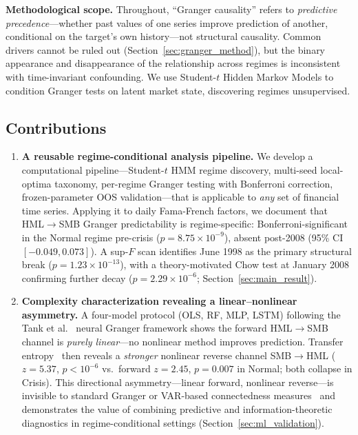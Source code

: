 \documentclass[sigconf,anonymous]{acmart}
\begin{document}
\textbf{Methodological scope.} Throughout, ``Granger causality'' refers
to \emph{predictive precedence}---whether past values of one series improve prediction
of another, conditional on the target's own history---not structural causality.
Common drivers cannot be ruled out (Section~\ref{sec:granger_method}), but the
binary appearance and disappearance of the relationship across regimes is
inconsistent with time-invariant confounding. We use Student-$t$ Hidden Markov Models to condition
Granger tests on latent market state, discovering regimes unsupervised.

\subsection{Contributions}

\begin{enumerate}
    \item \textbf{A reusable regime-conditional analysis pipeline.}
    We develop a computational pipeline---Student-$t$ HMM regime discovery,
    multi-seed local-optima taxonomy, per-regime Granger testing with
    Bonferroni correction, frozen-parameter OOS validation---that is
    applicable to \emph{any} set of financial time series. Applying
    it to daily Fama-French factors, we document that HML$\to$SMB
    Granger predictability is regime-specific: Bonferroni-significant
    in the Normal regime pre-crisis ($p = 8.75 \times 10^{-9}$),
    absent post-2008 (95\% CI $[-0.049, 0.073]$).
    A sup-$F$ scan identifies June 1998 as the primary structural break
    ($p = 1.23 \times 10^{-13}$), with a theory-motivated Chow test
    at January 2008 confirming further decay
    ($p = 2.29 \times 10^{-6}$; Section~\ref{sec:main_result}).

    \item \textbf{Complexity characterization revealing a linear--nonlinear asymmetry.}
    A four-model protocol (OLS, RF, MLP, LSTM) following the
    Tank et al.~\cite{tank2022neural} neural Granger framework shows
    the forward HML$\to$SMB channel is \emph{purely linear}---no
    nonlinear method improves prediction.
    Transfer entropy~\cite{schreiber2000measuring} then reveals a
    \emph{stronger} nonlinear reverse channel SMB$\to$HML
    ($z = 5.37$, $p < 10^{-6}$ vs.\ forward $z = 2.45$, $p = 0.007$
    in Normal; both collapse in Crisis). This directional
    asymmetry---linear forward, nonlinear reverse---is invisible
    to standard Granger or VAR-based connectedness
    measures~\cite{diebold2012better} and demonstrates the value
    of combining predictive and information-theoretic diagnostics
    in regime-conditional settings (Section~\ref{sec:ml_validation}).


\end{enumerate}
\end{document}
